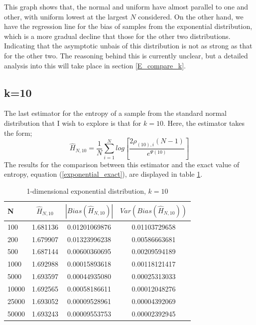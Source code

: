 \documentclass{report}
\begin{document}
This graph shows that, the normal and uniform have almost parallel to one and other, with uniform lowest at the largest $N$ considered. On the other hand, we have the regression line for the bias of samples from the exponential distribution, which is a more gradual decline that those for the other two distributions. Indicating that the asymptotic unbais of this distribution is not as strong as that for the other two. The reasoning behind this is currently unclear, but a detailed analysis into this will take place in section \ref{E_compare_k}.





\subsection{k=10} \label{E_k=10}

The last estimator for the entropy of a sample from the standard normal distribution that I wish to explore is that for $k=10$. Here, the estimator takes the form;
\begin{equation}
\hat{H}_{N, 10} = \frac{1}{N} \sum_{i=1}^{N} log \left[ \frac{2\rho_{(10),i}(N-1)}{e^{\Psi(10)}} \right] \nonumber
\end{equation}
The results for the comparison between this estimator and the exact value of entropy, equation (\ref{exponential_exact}), are displayed in table \ref{expo_k=10_table}.

\begin{table}
\caption{1-dimensional exponential distribution, $k=10$} \label{expo_k=10_table}
\begin{center}
\begin{tabular}{| l | c c c|} 
\toprule
N & $\hat{H}_{N, 10}$ & $|Bias(\hat{H}_{N, 10})|$ & $Var(Bias(\hat{H}_{N, 10}))$ \\
\midrule[1pt]
100     & 1.681136     & 0.01201069876     & 0.01103729658  \\
200     & 1.679907     & 0.01323996238     & 0.00586663681  \\
500     & 1.687144     & 0.00600360695     & 0.00209594189  \\
1000    & 1.692988     & 0.00015893618     & 0.00118121417  \\
5000    & 1.693597     & 0.00044935080     & 0.00025313033  \\
10000   & 1.692565     & 0.00058186611     & 0.00012048276  \\
25000   & 1.693052     & 0.00009528961     & 0.00004392069  \\
50000   & 1.693243     & 0.00009553753     & 0.00002392945  \\
\hline
\end{tabular}
\end{center}
\end{table}
\end{document}
